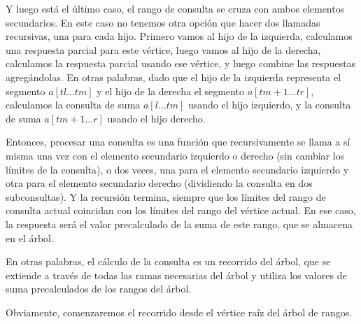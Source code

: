 Y luego está el último caso, el rango de consulta se cruza con ambos elementos secundarios. En este caso no tenemos otra opción que hacer dos llamadas recursivas, una para cada hijo. Primero vamos al hijo de la izquierda, calculamos una respuesta parcial para este vértice, luego vamos al hijo de la derecha, calculamos la respuesta parcial usando ese vértice, y luego combine las respuestas agregándolas. En otras palabras, dado que el hijo de la izquierda representa el segmento $a[tl \dots tm]$ y el hijo de la derecha el segmento $a[tm+1 \dots tr]$, calculamos la consulta de suma $a[l \dots tm ]$ usando el hijo izquierdo, y la consulta de suma $a[tm+1 \dots r]$ usando el hijo derecho.

Entonces, procesar una consulta es una función que recursivamente se llama a sí misma una vez con el elemento secundario izquierdo o derecho (sin cambiar los límites de la consulta), o dos veces, una para el elemento secundario izquierdo y otra para el elemento secundario derecho (dividiendo la consulta en dos subconsultas). Y la recursión termina, siempre que los límites del rango de consulta actual coincidan con los límites del rango del vértice actual. En ese caso, la respuesta será el valor precalculado de la suma de este rango, que se almacena en el árbol.

En otras palabras, el cálculo de la consulta es un recorrido del árbol, que se extiende a través de todas las ramas necesarias del árbol y utiliza los valores de suma precalculados de los rangos del árbol.

Obviamente, comenzaremos el recorrido desde el vértice raíz del árbol de rangos.

